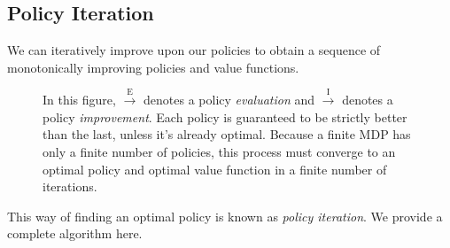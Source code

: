 \documentclass[12pt]{article}
\begin{document}
\subsection{Policy Iteration}
We can iteratively improve upon our policies to obtain a sequence of monotonically improving policies and value functions.
\begin{figure}[h]
  \centering
  \caption{\footnotesize In this figure, $\overset{\textrm{E}}{\longrightarrow}$ denotes a policy \emph{evaluation} and $\overset{\textrm{I}}{\longrightarrow}$ denotes a policy \emph{improvement}. Each policy is guaranteed to be strictly better than the last, unless it's already optimal. Because a finite MDP has only a finite number of policies, this process must converge to an optimal policy and optimal value function in a finite number of iterations.}
\end{figure}
This way of finding an optimal policy is known as \emph{policy iteration}. We provide a complete algorithm here.
\end{document}
